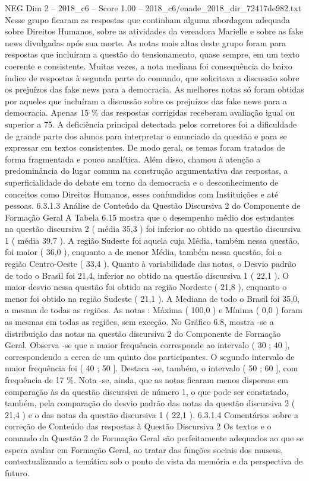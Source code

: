 \begin{textsample}{NEG Dim 2 – 2018\_c6 – Score 1.00 – 2018\_c6/enade\_2018\_dir\_72417de982.txt}
Nesse grupo ficaram as respostas que continham alguma abordagem adequada sobre Direitos Humanos, sobre as atividades da vereadora Marielle e sobre as fake news divulgadas após sua morte.
As notas mais altas deste grupo foram para respostas que incluíram a questão do tensionamento, quase sempre, em um texto coerente e consistente.
Muitas vezes, a nota mediana foi consequência do baixo índice de respostas à segunda parte do comando, que solicitava a discussão sobre os prejuízos das fake news para a democracia.
As melhores notas só foram obtidas por aqueles que incluíram a discussão sobre os prejuízos das fake news para a democracia.
Apenas 15 \% das respostas corrigidas receberam avaliação igual ou superior a 75.
A deficiência principal detectada pelos corretores foi a dificuldade de grande parte dos alunos para interpretar o enunciado da questão e para se expressar em textos consistentes.
De modo geral, os temas foram tratados de forma fragmentada e pouco analítica.
Além disso, chamou à atenção a predominância do lugar comum na construção argumentativa das respostas, a superficialidade do debate em torno da democracia e o desconhecimento de conceitos como Direitos Humanos, esses confundidos com Instituições e até pessoas. 6.3.1.3 Análise de Conteúdo da Questão Discursiva 2 do Componente de Formação Geral A Tabela 6.15 mostra que o desempenho médio dos estudantes na questão discursiva 2 ( média 35,3 ) foi inferior ao obtido na questão discursiva 1 ( média 39,7 ).
A região Sudeste foi aquela cuja Média, também nessa questão, foi maior ( 36,0 ), enquanto a de menor Média, também nessa questão, foi a região Centro-Oeste ( 33,4 ).
Quanto à variabilidade das notas, o Desvio padrão de todo o Brasil foi 21,4, inferior ao obtido na questão discursiva 1 ( 22,1 ).
O maior desvio nessa questão foi obtido na região Nordeste ( 21,8 ), enquanto o menor foi obtido na região Sudeste ( 21,1 ).
A Mediana de todo o Brasil foi 35,0, a mesma de todas as regiões.
As notas : Máxima ( 100,0 ) e Mínima ( 0,0 ) foram as mesmas em todas as regiões, sem exceção.
No Gráfico 6.8, mostra -se a distribuição das notas na questão discursiva 2 do Componente de Formação Geral.
Observa -se que a maior frequência corresponde ao intervalo ( 30 ; 40 ], correspondendo a cerca de um quinto dos participantes.
O segundo intervalo de maior frequência foi ( 40 ; 50 ].
Destaca -se, também, o intervalo ( 50 ; 60 ], com frequência de 17 \%.
Nota -se, ainda, que as notas ficaram menos dispersas em comparação às da questão discursiva de número 1, o que pode ser constatado, também, pela comparação do desvio padrão das notas da questão discursiva 2 ( 21,4 ) e o das notas da questão discursiva 1 ( 22,1 ). 6.3.1.4 Comentários sobre a correção de Conteúdo das respostas à Questão Discursiva 2 Os textos e o comando da Questão 2 de Formação Geral são perfeitamente adequados ao que se espera avaliar em Formação Geral, ao tratar das funções sociais dos museus, contextualizando a temática sob o ponto de vista da memória e da perspectiva de futuro.

\end{textsample}
